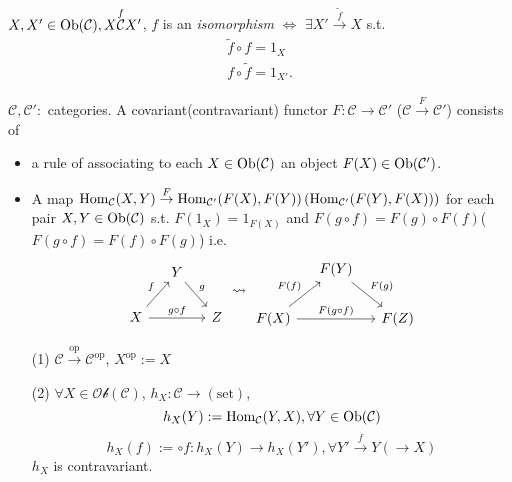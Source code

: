 \begin{definition}
  $X,X'\in \operatorname{Ob}(\mathcal{C}),X\overset{f}{\mathcal{C}}X'$, $f$ is an \textit{isomorphism} $\Leftrightarrow$ $\exists X'\overset{\widetilde{f}}{\to}X$ s.t. 
  \begin{align*}
    \widetilde{f}\circ f=1_{X}\\
    f\circ \widetilde{f}=1_{X'}
  .\end{align*}
\end{definition}
\begin{definition}[Functors]
     $\mathcal{C},\mathcal{C}':$ categories.
      A covariant(contravariant) functor $F:\mathcal{C}\to\mathcal{C}'$ ($\mathcal{C}\overset{F}{\to}\mathcal{C}'$) consists of 
      \begin{itemize}
	\item a rule of associating to each $X\in \operatorname{Ob}(\mathcal{C})$ an object $F(X)\in \operatorname{Ob}(\mathcal{C}')$.
	\item A map $\operatorname{Hom}_{\mathcal{C}}(X,Y)\overset{F}{\to} \operatorname{Hom}_{\mathcal{C}'}(F(X),F(Y))\left( \operatorname{Hom}_{\mathcal{C}'}(F(Y),F(X)) \right) $ for each pair $X,Y\in \operatorname{Ob}(\mathcal{C})$ s.t. $F(1_X)=1_{F(X)}$ and $F(g\circ f)=F(g)\circ F(f)$($F(g\circ f)=F(f)\circ F(g)$) i.e. 
	   \[
	     \begin{tikzcd}[column sep=small]
	    & Y\arrow{rd}{g} & \\
	    X\arrow{ru}{f} \arrow{rr}{g\circ f}& & Z
	  \end{tikzcd} \rightsquigarrow 
	  \begin{tikzcd}[column sep=small]
	    & F(Y)\arrow{rd}{F(g)} & \\
	    F(X)\arrow{ru}{F(f)} \arrow{rr}{F(g\circ f)}& & F(Z)
	  \end{tikzcd} 
	  \] 
      \end{itemize}
\end{definition}
\begin{example}
  \begin{enumerate}
    \item []
    \item [(1)] $\mathcal{C}\overset{\text{op}}{\to}\mathcal{C}^{\text{op}}$, $X^{\text{op}}:=X$
    \item [(2)] $\forall X\in \mathcal{Ob}(\mathcal{C})$, $h_X:\mathcal{C}\to (\text{set})$, 
      \[
	h_X(Y):=\operatorname{Hom}_{\mathcal{C}}(Y,X),\forall Y\in \operatorname{Ob}(\mathcal{C})
      \] 
      \[
	h_X(f):=\circ f:h_X(Y)\to h_X(Y'),\forall Y'\overset{f}{\to}Y(\to X)
      \] $h_X$ is contravariant. 
  \end{enumerate}
\end{example}


